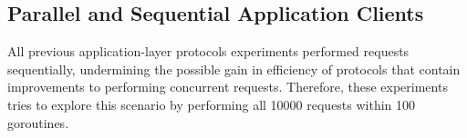 \subsection{Parallel and Sequential Application Clients}

All previous application-layer protocols experiments performed requests sequentially, undermining the possible gain in efficiency of protocols that contain improvements to performing concurrent requests. Therefore, these experiments tries to explore this scenario by performing all 10000 requests within 100 goroutines.


\clearpage


\clearpage


\clearpage
